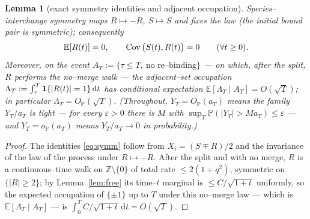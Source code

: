 \documentclass[11pt]{article}
\theoremstyle{plain}
\newtheorem{lemma}[theorem]{Lemma}
\theoremstyle{definition}
\theoremstyle{remark}
\newcommand{\Z}{\mathbb{Z}}\newcommand{\R}{\mathbb{R}}\newcommand{\N}{\mathbb{N}}
\newcommand{\E}{\mathbb{E}}\newcommand{\PP}{\mathbb{P}}\newcommand{\dd}{\,\mathrm{d}}
\begin{document}
\begin{lemma}[exact symmetry identities and adjacent occupation]\label{lem:occ}
Species--interchange symmetry maps $R\mapsto-R$, $S\mapsto S$ and fixes the law (the
initial bound pair is symmetric); consequently
\begin{equation}\label{eq:symm}
  \E[R(t)]=0,\qquad \Cov\big(S(t),R(t)\big)=0\qquad(\forall t\ge0).
\end{equation}
Moreover, on the event $A_T:=\{\tau\le T,\ \text{no re--binding}\}$ --- on which, after
the split, $R$ performs the no--merge walk --- the adjacent--set occupation
$\Lambda_T:=\int_\tau^T\bone\{|R(t)|=1\}\dd t$ has conditional expectation
$\E[\Lambda_T\mid A_T]=O(\sqrt T)$; in particular $\Lambda_T=O_\PP(\sqrt T)$. (Throughout,
$Y_T=O_\PP(a_T)$ means the family $Y_T/a_T$ is tight --- for every $\varepsilon>0$ there is
$M$ with $\sup_T\PP(|Y_T|>M a_T)\le\varepsilon$ --- and $Y_T=o_\PP(a_T)$ means
$Y_T/a_T\to0$ in probability.)
\end{lemma}
\begin{proof}
The identities \eqref{eq:symm} follow from $X_i=(S\mp R)/2$ and the invariance of the
law of the process under $R\mapsto-R$. After the split and with no merge, $R$ is a
continuous--time walk on $\Z\setminus\{0\}$ of total rate $\le2(1+q^2)$, symmetric on
$\{|R|\ge2\}$; by Lemma~\ref{lem:free} its time--$t$ marginal is $\le C/\sqrt{1+t}$
uniformly, so the expected occupation of $\{\pm1\}$ up to $T$ under this no--merge law
--- which is $\E[\Lambda_T\mid A_T]$ --- is $\int_0^T C/\sqrt{1+t}\dd t=O(\sqrt T)$.
\end{proof}
\end{document}
